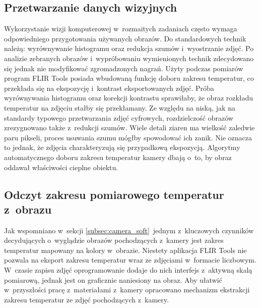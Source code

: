 \subsection{Przetwarzanie danych wizyjnych}
Wykorzystanie wizji komputerowej w~rozmaitych zadaniach często wymaga
odpowiedniego przygotowania używanych obrazów.
Do standardowych technik należą: wyrównywanie histogramu oraz redukcja szumów
i~wyostrzanie zdjęć.
Po analizie zebranych obrazów i~wypróbowaniu wymienionych technik zdecydowano
się jednak nie modyfikować zgromadzonych nagrań.
Użyty podczas pomiarów program FLIR Tools posiada wbudowaną funkcję doboru
zakresu temperatur, co przekłada się na ekspozycję i~kontrast eksportowanych
zdjęć.
Próba wyrównywania histogramu oraz korekcji kontrastu sprawiłaby, że obraz
rozkładu temperatur na zdjęciu stałby się przekłamany.
Ze względu na niską, jak na standardy typowego przetwarzania zdjęć cyfrowych,
rozdzielczość obrazów zrezygnowano także z~redukcji szumów.
Wiele detali ziaren ma wielkość zaledwie paru pikseli, proces usuwania szumu
mógłby spowodować ich zanik.
Nie oznacza to jednak, że zdjęcia charakteryzują się przypadkową ekspozycją.
Algorytmy automatycznego doboru zakresu temperatur kamery dbają o~to, by obraz
oddawał właściwości cieplne obiektu.

\subsection{Odczyt zakresu pomiarowego temperatur z~obrazu}
Jak wspomniano w~sekcji \ref{subsec:camera_soft}~jednym z~kluczowych czynników
decydujących o~wyglądzie obrazów pochodzących z~kamery jest zakres temperatur
mapowany na kolory w~obrazie.
Niestety aplikacja FLIR Tools nie pozwala na eksport zakresu temperatur wraz ze
zdjęciami w~formacie liczbowym.
W~czasie zapisu zdjęć oprogramowanie dodaje do nich interfejs z~aktywną skalą
pomiarową, jednak jest on graficznie naniesiony na obraz.
Aby ułatwić w~przyszłości pracę z~materiałami z~kamery opracowano mechanizm
ekstrakcji zakresu temperatur ze zdjęć pochodzących z~kamery.

